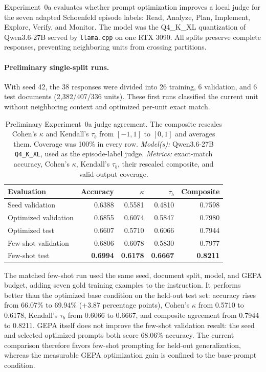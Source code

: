 \documentclass[manuscript,screen,review]{jair}
\newcommand{\modelmetrics}[2]{\textit{Model(s):} #1. \textit{Metrics:} #2.}
\begin{document}
Experiment~0a evaluates whether prompt optimization improves a local judge for
the seven adapted Schoenfeld episode labels: Read, Analyze, Plan, Implement,
Explore, Verify, and Monitor.  The model was the Q4\_K\_XL quantization of
Qwen3.6-27B served by \texttt{llama.cpp} on one RTX 3090.  All splits preserve
complete responses, preventing neighboring units from crossing partitions.

\paragraph{Preliminary single-split runs.}
With seed 42, the 38 responses were divided into 26 training, 6 validation,
and 6 test documents (2,382/407/336 units).  These first runs classified the
current unit without neighboring context and optimized per-unit exact match.

\begin{table}[t]
\centering
\caption{Preliminary Experiment~0a judge agreement.  The composite rescales Cohen's
$\kappa$ and Kendall's $\tau_b$ from $[-1,1]$ to $[0,1]$ and averages them.
Coverage was 100\% in every row.  \modelmetrics{Qwen3.6-27B
\texttt{Q4\_K\_XL}, used as the episode-label judge}{exact-match accuracy,
Cohen's $\kappa$, Kendall's $\tau_b$, their rescaled composite, and valid-output
coverage}}
\label{tab:exp0a-judge}
\begin{tabular}{lrrrr}
\toprule
Evaluation & Accuracy & $\kappa$ & $\tau_b$ & Composite \\
\midrule
Seed validation      & 0.6388 & 0.5581 & 0.4810 & 0.7598 \\
Optimized validation & 0.6855 & 0.6074 & 0.5847 & 0.7980 \\
Optimized test       & 0.6607 & 0.5710 & 0.6066 & 0.7944 \\
Few-shot validation  & 0.6806 & 0.6078 & 0.5830 & 0.7977 \\
Few-shot test        & \textbf{0.6994} & \textbf{0.6178} &
\textbf{0.6667} & \textbf{0.8211} \\
\bottomrule
\end{tabular}
\end{table}

The matched few-shot run used the same seed, document split, model, and GEPA
budget, adding seven gold training examples to the instruction.  It performs
better than the optimized base condition on the held-out test set: accuracy
rises from 66.07\% to 69.94\% (+3.87 percentage points), Cohen's $\kappa$ from
0.5710 to 0.6178, Kendall's $\tau_b$ from 0.6066 to 0.6667, and composite
agreement from 0.7944 to 0.8211.  GEPA itself does not improve the few-shot
validation result: the seed and selected optimized prompts both score 68.06\%
accuracy.  The current comparison therefore favors few-shot prompting for
held-out generalization, whereas the measurable GEPA optimization gain is
confined to the base-prompt condition.
\end{document}
